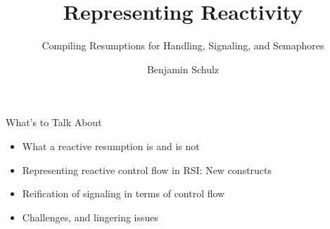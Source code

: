 \documentclass{beamer}
\title{Representing Reactivity}
\subtitle{Compiling Resumptions for Handling, Signaling, and Semaphores}
\author{Benjamin Schulz}
\begin{document}
\maketitle{}

\begin{frame}{What's to Talk About}

\begin{itemize}

\item{What a reactive resumption is and is not}

\item{Representing reactive control flow in RSI: New constructs}

\item{Reification of signaling in terms of control flow}

\item{Challenges, and lingering issues}

\end{itemize}

\end{frame}
\end{document}
